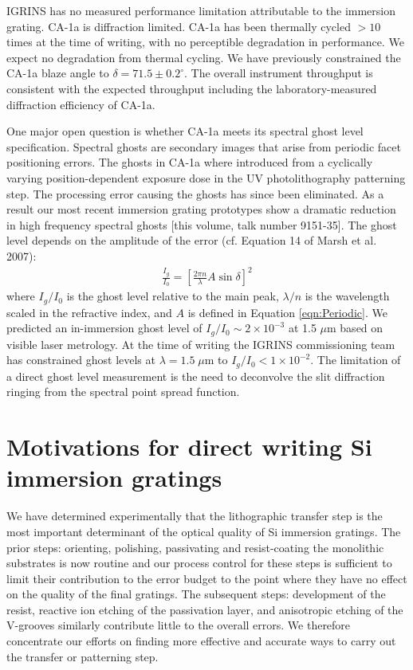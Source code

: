 IGRINS has no measured performance limitation attributable to the immersion grating.  CA-1a is diffraction limited.  CA-1a has been thermally cycled $>10$ times at the time of writing, with no perceptible degradation in performance.  We expect no degradation from thermal cycling.  We have previously constrained the CA-1a blaze angle to $\delta = 71.5\pm 0.2^\circ$.  The overall instrument throughput is consistent with the expected throughput including the laboratory-measured diffraction efficiency of CA-1a.

One major open question is whether CA-1a meets its spectral ghost level specification.  Spectral ghosts are secondary images that arise from periodic facet positioning errors\cite{2007sdf..book.....J}. The ghosts in CA-1a where introduced from a cyclically varying position-dependent exposure dose in the UV photolithography patterning step.  The processing error causing the ghosts has since been eliminated.  As a result our most recent immersion grating prototypes show a dramatic reduction in high frequency spectral ghosts [this volume, talk number 9151-35]\cite{2014SPIE.9151E..1GB}.  The ghost level depends on the amplitude of the error (cf. Equation 14 of Marsh et al. 2007\cite{2007ApOpt..46.3400M}):
\begin{eqnarray}
	\frac{I_g}{I_0}=[ \frac{2\pi n}{\lambda}A \sin{\delta} ]^2	 \label{eqn:GLevel}
\end{eqnarray}
where $I_g/I_0$ is the ghost level relative to the main peak, $\lambda/n$ is the wavelength scaled in the refractive index, and $A$ is defined in Equation \ref{eqn:Periodic}.  We predicted an in-immersion ghost level of $I_g/I_0 \sim2\times10^{-3}$ at 1.5 $\mu$m based on visible laser metrology\cite{2012SPIE.8450E..2SG}.  At the time of writing the IGRINS commissioning team has constrained ghost levels at $\lambda=1.5 \; \mu$m to $I_g/I_0 < 1\times10^{-2}$.  The limitation of a direct ghost level measurement is the need to deconvolve the slit diffraction ringing from the spectral point spread function.

\section{Motivations for direct writing Si immersion gratings}
We have determined experimentally that the lithographic transfer step is the most important determinant of the optical quality of Si immersion gratings.  The prior steps: orienting, polishing, passivating and resist-coating the monolithic substrates is now routine and our process control for these steps is sufficient to limit their contribution to the error budget to the point where they have no effect on the quality of the final gratings\cite{2007ApOpt..46.3400M,2014SPIE.9151E..1GB}.  The subsequent steps: development of the resist, reactive ion etching of the passivation layer, and anisotropic etching of the V-grooves similarly contribute little to the overall errors.  We therefore concentrate our efforts on finding more effective and accurate ways to carry out the transfer or patterning step.  

